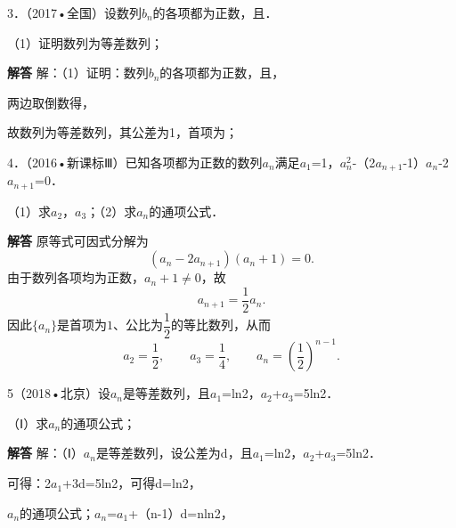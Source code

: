 3．（2017•全国）设数列{\ensuremath{b_{n}}}的各项都为正数，且．\par
（1）证明数列为等差数列；\par
\QuestionSpace{3.5cm}
\ifshowanswers
\par\begingroup\color{solutioncolor}\noindent\textbf{解答}\quad
解：（1）证明：数列{\ensuremath{b_{n}}}的各项都为正数，且，\par
两边取倒数得，\par
故数列为等差数列，其公差为1，首项为；\par
\par\endgroup\fi

4．（2016•新课标Ⅲ）已知各项都为正数的数列{\ensuremath{a_{n}}}满足\ensuremath{a_{1}}=1，\ensuremath{a_{n}^{2}}-（2\ensuremath{a_{n+1}}-1）\ensuremath{a_{n}}-2\ensuremath{a_{n+1}}=0．\par
（1）求\ensuremath{a_{2}}，\ensuremath{a_{3}}；（2）求{\ensuremath{a_{n}}}的通项公式．\par
\QuestionSpace{3.5cm}
\ifshowanswers
\par\begingroup\color{solutioncolor}\noindent\textbf{解答}\quad
原等式可因式分解为
\[
 (a_n-2a_{n+1})(a_n+1)=0.
\]
由于数列各项均为正数，$a_n+1\ne0$，故
\[
 a_{n+1}=\frac12a_n.
\]
因此$\{a_n\}$是首项为$1$、公比为$\dfrac12$的等比数列，从而
\[
 a_2=\frac12,\qquad a_3=\frac14,
\qquad
 \boxed{a_n=\left(\frac12\right)^{n-1}}.
\]
\par\endgroup\fi

5（2018•北京）设{\ensuremath{a_{n}}}是等差数列，且\ensuremath{a_{1}}=ln2，\ensuremath{a_{2}}+\ensuremath{a_{3}}=5ln2．\par
（Ⅰ）求{\ensuremath{a_{n}}}的通项公式；\par
\ifshowanswers
\par\begingroup\color{solutioncolor}\noindent\textbf{解答}\quad
解：（Ⅰ）{\ensuremath{a_{n}}}是等差数列，设公差为d，且\ensuremath{a_{1}}=ln2，\ensuremath{a_{2}}+\ensuremath{a_{3}}=5ln2．\par
可得：2\ensuremath{a_{1}}+3d=5ln2，可得d=ln2，\par
{\ensuremath{a_{n}}}的通项公式；\ensuremath{a_{n}}=\ensuremath{a_{1}}+（n-1）d=nln2，\par
\par\endgroup\fi

